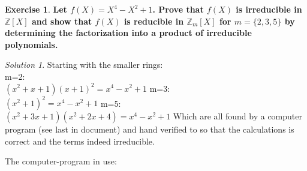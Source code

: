 \documentclass[a4paper,twoside=false,abstract=false,numbers=noenddot,
titlepage=false,headings=small,parskip=half,version=last]{scrartcl}
\theoremstyle{definition}
\newtheorem{exercise}{Exercise}
\theoremstyle{remark}
\newtheorem*{solution}{Solution}
\newcommand{\ZZ}{\ensuremath{\mathbb{Z}}}
\begin{document}
\begin{exercise}
{\bf
Let $f(X)=X^4-X^2+1$. Prove that $f(X)$ is irreducible in $\ZZ\left[X\right]$
and show that $f(X)$ is reducible in $\ZZ_m\left[X\right]$ for
$m=\{2,3,5\}$ by determining the factorization into a product of
irreducible polynomials.
}
\end{exercise}
\begin{solution}
Starting with the smaller rings:\\
m=2:\\
$(x^2+x+1)(x+1)^2=x^4-x^2+1$
m=3:\\
$(x^2+1)^2=x^4-x^2+1$
m=5:\\
$(x^2+3x+1)(x^2+2x+4)=x^4-x^2+1$
Which are all found by a computer program (see last in document) and hand verified to so that the
calculations is correct and the terms indeed irreducible.\\



\end{solution}
The computer-program in use:\\
\end{document}
